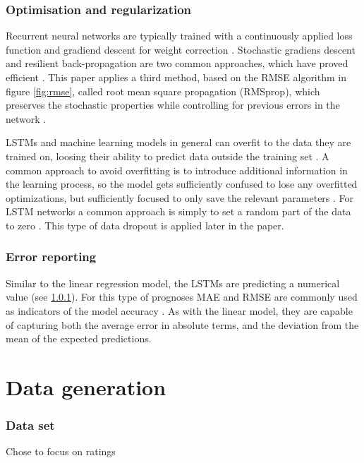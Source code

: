 \documentclass[a4paper]{article}
\begin{document}
\subsubsection{Optimisation and regularization}
Recurrent neural networks are typically trained with a continuously applied
loss function and gradiend descent for weight correction \citep{Russell2014,
Hochreiter1997, Schmidhubner2015}. Stochastic gradiens descent and resilient
back-propagation are two common approaches, which have proved efficient
\citep{Russell2014, NILSSON2009}. This paper applies a third method, based on
the RMSE algorithm in figure \ref{fig:rmse}, called root mean square propagation
(RMSprop), which preserves the stochastic properties while controlling
for previous errors in the network \citep{Tieleman2012}.

LSTMs and machine learning models in general can overfit to the data
they are trained on, loosing their ability to predict data outside the training
set \citep{Russell2014, NILSSON2009}.
A common approach to avoid overfitting is to introduce additional
information in the learning process, so the model gets sufficiently confused
to lose any overfitted optimizations, but sufficiently focused to only save
the relevant parameters \citep{Schmidhubner2015, NILSSON2009}. For LSTM networks
a common approach is simply to set a random part of the data to zero
\citep{Schmidhubner2015}. This type of data dropout is applied later in the
paper.

\subsubsection{Error reporting}
Similar to the linear regression model, the LSTMs are predicting a numerical
value (see \ref{sec:dataset}). For this type of prognoses MAE and RMSE are
commonly used as indicators of the model accuracy
\citep{Russel2014, NILSSON2009, Schmidhubner2015}. As with the linear model,
they are capable of capturing both the average error in absolute terms,
and the deviation from the mean of the expected predictions.

\section{Data generation}

\subsubsection{Data set}
\label{sec:dataset}
Chose to focus on ratings
\end{document}
